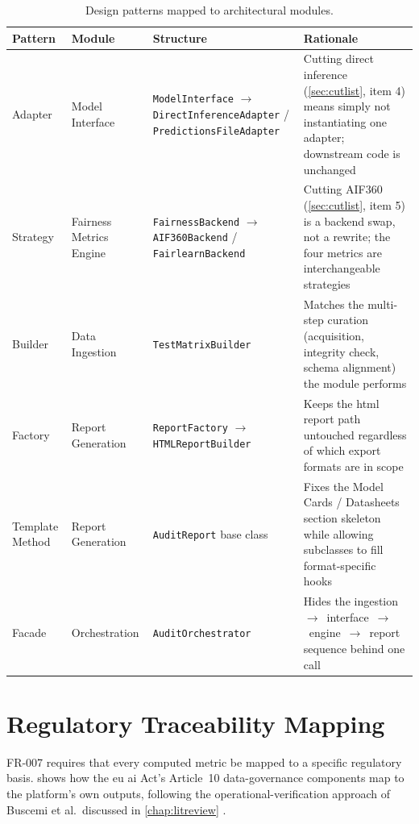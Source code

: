 \begin{table}[htbp]
    \centering
    \caption{Design patterns mapped to architectural modules.}
    \label{tab:patterns}
    \begin{tabular}{p{2.2cm}p{3cm}p{2.8cm}p{5.5cm}}
        \toprule
        \textbf{Pattern} & \textbf{Module} & \textbf{Structure} & \textbf{Rationale} \\
        \midrule
        Adapter & Model Interface & \texttt{ModelInterface} $\to$ \texttt{DirectInferenceAdapter} / \texttt{PredictionsFileAdapter} & Cutting direct inference (\cref{sec:cutlist}, item 4) means simply not instantiating one adapter; downstream code is unchanged \\
        Strategy & Fairness Metrics Engine & \texttt{FairnessBackend} $\to$ \texttt{AIF360Backend} / \texttt{FairlearnBackend} & Cutting AIF360 (\cref{sec:cutlist}, item 5) is a backend swap, not a rewrite; the four metrics are interchangeable strategies \\
        Builder & Data Ingestion & \texttt{TestMatrixBuilder} & Matches the multi-step curation (acquisition, integrity check, schema alignment) the module performs \\
        Factory & Report Generation & \texttt{ReportFactory} $\to$ \texttt{HTMLReportBuilder} & Keeps the \gls{html} report path untouched regardless of which export formats are in scope \\
        Template Method & Report Generation & \texttt{AuditReport} base class & Fixes the Model Cards / Datasheets section skeleton while allowing subclasses to fill format-specific hooks \\
        Facade & Orchestration & \texttt{AuditOrchestrator} & Hides the ingestion~$\to$~interface~$\to$~engine~$\to$~report sequence behind one call \\
        \bottomrule
    \end{tabular}
\end{table}

\section{Regulatory Traceability Mapping}
\label{sec:regmapping}

FR-007 requires that every computed metric be mapped to a specific regulatory basis.  shows how the \gls{eu} \gls{ai} Act's Article~10 data-governance components map to the platform's own outputs, following the operational-verification approach of Buscemi et al.\ discussed in \cref{chap:litreview} \cite{buscemi2025assessing,euaiact2024}.

